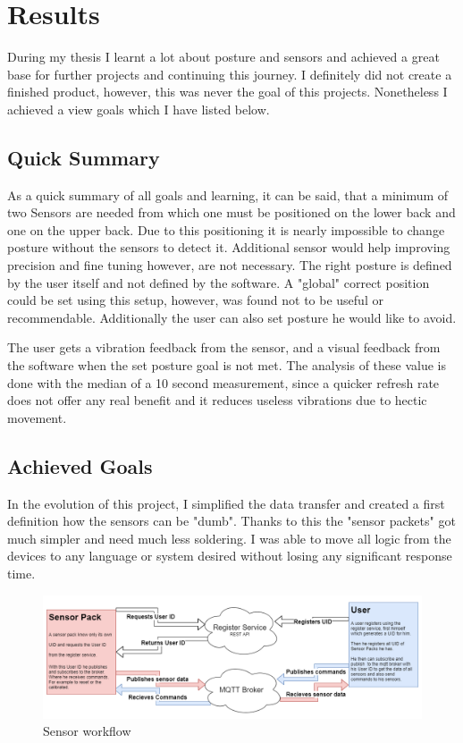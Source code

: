\chapter*{Results}
\label{chap:Results}
\setcounter{section}{0}

During my thesis I learnt a lot about posture and sensors and achieved a great base for further projects and continuing this journey. I definitely did not create a finished product, however, this was never the goal of this projects. Nonetheless I achieved a view goals which I have listed below.

\section{Quick Summary}

As a quick summary of all goals and learning, it can be said, that a minimum of two Sensors are needed from which one must be positioned on the lower back and one on the upper back. Due to this positioning it is nearly impossible to change posture without the sensors to detect it. Additional sensor would help improving precision and fine tuning however, are not necessary. The right posture is defined by the user itself and not defined by the software. A "global" correct position could be set using this setup, however, was found not to be useful or recommendable. \cite{SitUpSt77:online} Additionally the user can also set posture he would like to avoid.

The user gets a vibration feedback from the sensor, and a visual feedback from the software when the set posture goal is not met. The analysis of these value is done with the median of a 10 second measurement, since a quicker refresh rate does not offer any real benefit and it reduces useless vibrations due to hectic movement.

\section{Achieved Goals}

In the evolution of this project, I simplified the data transfer and created a first definition how the sensors can be "dumb". Thanks to this the "sensor packets" got much simpler and need much less soldering. I was able to move all logic from the devices to any language or system desired without losing any significant response time. 

\begin{figure}[h]
  \begin{center}
\includegraphics[width=\textwidth]{images/DumbSensor.png}
  \end{center}
  \caption{Sensor workflow}
  \label{fig:SensorWorkflow}
\end{figure}

